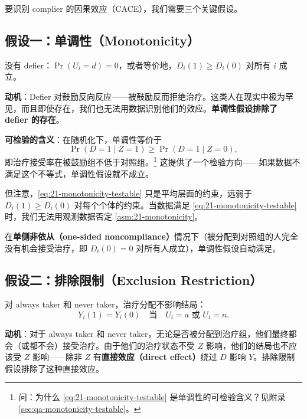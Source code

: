 要识别 complier 的因果效应（CACE），我们需要三个关键假设。

\subsection{假设一：单调性（Monotonicity）}

\begin{Assumption}[单调性]\label{asm:21-monotonicity}
没有 defier：$\Pr(U_i = d) = 0$，或者等价地，$D_i(1) \geq D_i(0)$ 对所有 $i$ 成立。
\end{Assumption}

\textbf{动机}：Defier 对鼓励反向反应——被鼓励反而拒绝治疗。这类人在现实中极为罕见，而且即使存在，我们也无法用数据识别他们的效应。\textbf{单调性假设排除了 defier 的存在}。

\textbf{可检验的含义}：在随机化下，单调性等价于
\begin{equation}
\Pr(D = 1 \mid Z = 1) \geq \Pr(D = 1 \mid Z = 0),
\label{eq:21-monotonicity-testable}
\end{equation}
即治疗接受率在被鼓励组不低于对照组。\footnote{问：为什么 \cref{eq:21-monotonicity-testable} 是单调性的可检验含义？见附录 \cref{sec:qa-monotonicity-testable}。} 这提供了一个检验方向——如果数据不满足这个不等式，单调性假设就不成立。

但注意，\cref{eq:21-monotonicity-testable} 只是平均层面的约束，远弱于 $D_i(1) \geq D_i(0)$ 对每个个体的约束。当数据满足 \cref{eq:21-monotonicity-testable} 时，我们无法用观测数据否定 \cref{asm:21-monotonicity}。

在\textbf{单侧非依从（one-sided noncompliance）}情况下（被分配到对照组的人完全没有机会接受治疗，即 $D_i(0) = 0$ 对所有人成立），单调性假设自动满足。

\subsection{假设二：排除限制（Exclusion Restriction）}

\begin{Assumption}[排除限制]\label{asm:21-exclusion}
对 always taker 和 never taker，治疗分配不影响结局：
\[
Y_i(1) = Y_i(0) \quad \text{当} \quad U_i = a \text{ 或 } U_i = n.
\]
\end{Assumption}

\textbf{动机}：对于 always taker 和 never taker，无论是否被分配到治疗组，他们最终都会（或都不会）接受治疗。由于他们的治疗状态不受 $Z$ 影响，他们的结局也不应该受 $Z$ 影响——除非 $Z$ 有\textbf{直接效应（direct effect）}绕过 $D$ 影响 $Y$。排除限制假设排除了这种直接效应。

